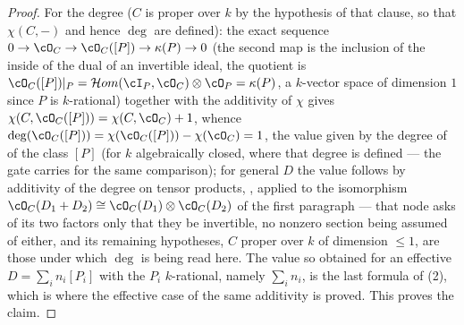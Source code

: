 \begin{proof}
For the degree ($C$ is proper over $k$ by the hypothesis of that
clause, so that $\chi(C,-)$ and hence $\deg$ are defined): the exact
sequence $0\to\cO_C\to\cO_C([P])\to\kappa(P)\to0$ (the second map is the
inclusion of the inside of the dual of an invertible ideal, the
quotient is $\cO_C([P])|_P=\mathcal{H}om(\cI_P,\cO_C)\otimes\cO_P
=\kappa(P)$, a $k$-vector space of dimension $1$ since $P$ is
$k$-rational) together with the additivity of $\chi$
 gives
$\chi(C,\cO_C([P]))=\chi(C,\cO_C)+1$, whence
$\deg(\cO_C([P]))=\chi(\cO_C([P]))-\chi(\cO_C)=1$, the value given by
the degree of  of the class $[P]$ (for $k$
algebraically closed, where that degree is defined --- the gate
 carries for the same comparison); for
general $D$
the value follows by additivity of the degree on tensor products,
, applied to the isomorphism
$\cO_C(D_1+D_2)\cong\cO_C(D_1)\otimes\cO_C(D_2)$ of the first paragraph
--- that node asks of its two factors only that they be invertible, no
nonzero section being assumed of either, and its remaining hypotheses,
$C$ proper over $k$ of dimension $\le1$, are those under which $\deg$ is
being read here.  The value so obtained for an effective
$D=\sum_in_i[P_i]$ with the $P_i$ $k$-rational, namely $\sum_in_i$, is
the last formula of (2), which is where
the effective case of the same additivity is proved.  This proves the
claim.
\end{proof}

